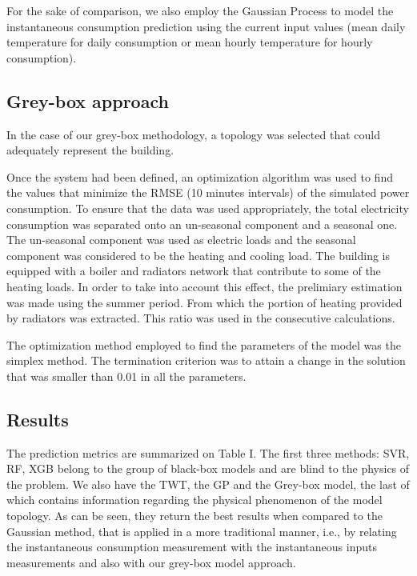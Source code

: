 \documentclass[10pt, conference, compsocconf]{IEEEtran}
\begin{document}
For the sake of comparison, we also employ the Gaussian Process to model the instantaneous consumption prediction using the current input values (mean daily temperature for daily consumption or mean hourly temperature for hourly consumption).


\subsection{Grey-box approach}

In the case of our grey-box methodology, a topology was selected that could adequately represent the building.


Once the system had been defined, an optimization algorithm was used to find the values that minimize the RMSE (10 minutes intervals) of the simulated power consumption. To ensure that the data was used appropriately, the total electricity consumption was separated onto an un-seasonal component and a seasonal one. The un-seasonal component was used as electric loads and the seasonal component was considered to be the heating and cooling load. The building is equipped with a boiler and radiators network that contribute to some of the heating loads. In order to take into account this effect, the prelimiary estimation was made using the summer period. From which the portion of heating provided by radiators was extracted. This ratio was used in the consecutive calculations.

The optimization method employed to find the parameters of the model was the simplex method. The termination criterion was to attain a change in the solution that was smaller than 0.01 in all the parameters. %


\subsection{Results}

The prediction metrics are summarized on Table I. The first three methods: SVR, RF, XGB  belong to the group of black-box models and are blind to the physics of the problem. We also have the TWT, the GP and the Grey-box model, the last of which contains information regarding the physical phenomenon of the model topology. As can be seen, they return the best results when compared to the Gaussian method, that is applied in a more traditional manner, i.e., by relating the instantaneous consumption measurement with the instantaneous inputs measurements and also with our grey-box model approach. 
\end{document}
